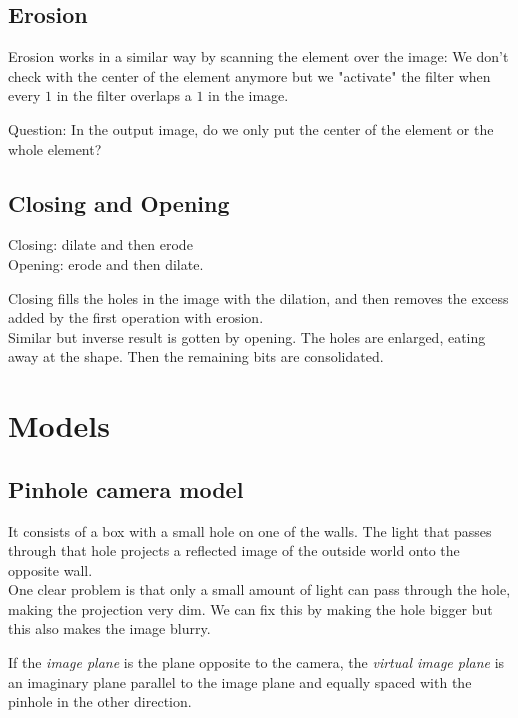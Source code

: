 \documentclass{article}
\begin{document}
\subsection{Erosion}
Erosion works in a similar way by scanning the element over the image: We don't check with the center of the element anymore but we "activate" the filter when every $1$ in the filter overlaps a $1$ in the image.

Question: In the output image, do we only put the center of the element or the whole element?

\subsection{Closing and Opening}
Closing: dilate and then erode \\
Opening: erode and then dilate.

Closing fills the holes in the image with the dilation, and then removes the excess added by the first operation with erosion.\\
Similar but inverse result is gotten by opening. The holes are enlarged, eating away at the shape. Then the remaining bits are consolidated.

\section{Models}
\subsection{Pinhole camera model}
It consists of a box with a small hole on one of the walls. The light that passes through that hole projects a reflected image of the outside world onto the opposite wall.\\
One clear problem is that only a small amount of light can pass through the hole, making the projection very dim. We can fix this by making the hole bigger but this also makes the image blurry.

If the \textit{image plane} is the plane opposite to the camera, the \textit{virtual image plane} is an imaginary plane parallel to the image plane and equally spaced with the pinhole in the other direction.
\end{document}
